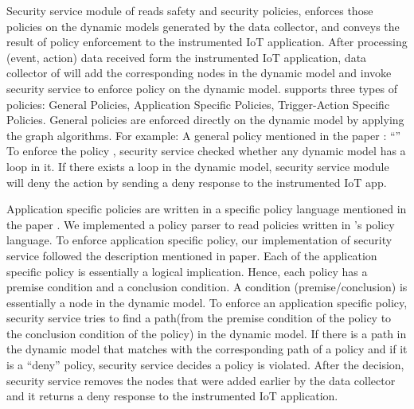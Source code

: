 Security service module of \iotguard reads safety and security policies, enforces those policies on the dynamic models generated by the data collector, and conveys the result of policy enforcement to the instrumented IoT application.
After processing (event, action) data received form the instrumented IoT application, data collector of \iotguard will add the corresponding nodes in the dynamic model and invoke security service to enforce policy on the dynamic model.
\iotguard supports three types of policies: General Policies, Application Specific Policies, Trigger-Action Specific Policies.
General policies are enforced directly on the dynamic model by applying the graph algorithms.
For example: A general policy mentioned in the \iotguard paper \cite{iotguard2019ndss}:
``''
To enforce the policy , security service checked whether any dynamic model has a loop in it.
If there exists a loop in the dynamic model, security service module will deny the action by sending a deny response to the instrumented IoT app.

Application specific policies are written in a specific policy language mentioned in the \iotguard paper \cite{iotguard2019ndss}.
We implemented a policy parser to read policies written in \iotguard's policy language. To enforce application specific policy, our implementation of security service followed the description mentioned in \iotguard paper. %
Each of the application specific policy is essentially a logical implication.
Hence, each policy has a premise condition and a conclusion condition.
A condition (premise/conclusion) is essentially a node in the dynamic model.
To enforce an application specific policy, security service tries to find a path(from the premise condition of the policy to the conclusion condition of the policy) in the dynamic model.
If there is a path in the dynamic model that matches with the corresponding path of a policy and if it is a ``deny'' policy, security service decides a policy is violated.
After the decision, security service removes the nodes that were added earlier by the data collector and it returns a deny response to the instrumented IoT application.


